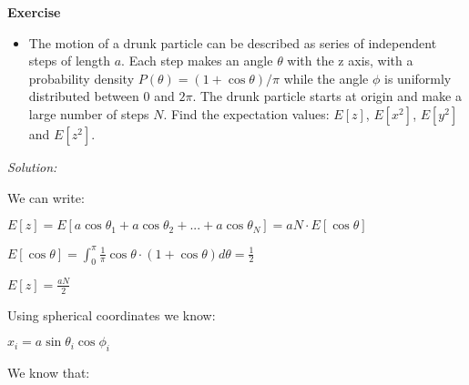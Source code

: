 \documentclass[paper=9in:6in,pagesize=pdftex,headinclude=on,footinclude=on,10pt,bibtotoc,pointlessnumbers,normalheadings,DIV=9,twoside=false]{scrbook}
\begin{document}
\date{}


\begin{large} 
 \textbf{Exercise}
\end{large} 
\begin{itemize} 
\item The motion of a drunk particle can be described as series of independent steps of length $a$. Each step makes an angle $\theta$  with the z axis, with a probability density $P(\theta)= (1+\cos{\theta})/\pi$ while the angle $\phi$ is uniformly distributed between 0 and $2\pi$. The drunk particle starts at origin and make a large number of steps $N$. Find the expectation values: $E[z]$, $E[x^2]$, $E[y^2]$ and $E[z^2]$.
\end{itemize}

\begin{large}
\textit{Solution:\\}
\end{large}

\begin{text}
We can write:\\

\begin{center}
$E[z]= E[a\cos{\theta_1}+a\cos{\theta_2}+...+a\cos{\theta_{N}}]= aN \cdotp E[\cos{\theta}]$\\
\end{center}
\end{text}

\begin{center}

$E[\cos{\theta}]= \int_{0}^{\pi} \frac{1}{\pi} \cos{\theta}\cdotp(1+\cos{\theta}) d\theta = \frac{1}{2}$\\
\end{center}
\begin{center}
$E[z]=\frac{aN}{2}$\\
\end{center}

\begin{text}
Using spherical coordinates we know: \\
\end{text}

\begin{center}
$x_{i}= a\sin{\theta_{i}}\cos{\phi_{i}}$ \\
\end{center}

\begin{text}
We know that:\\
\end{text}
\end{document}

